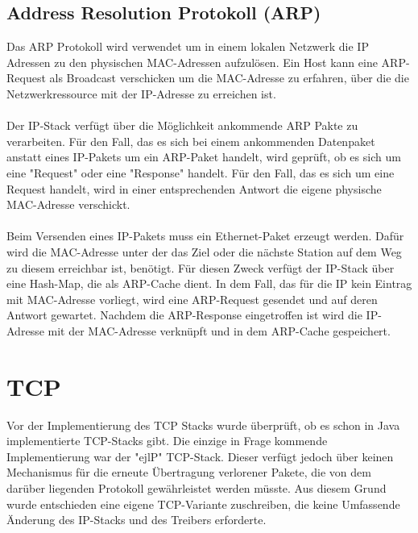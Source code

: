 \subsection{Address Resolution Protokoll (ARP)}
Das ARP Protokoll wird verwendet um in einem lokalen Netzwerk die IP Adressen zu den physischen MAC-Adressen aufzulösen. Ein Host kann eine ARP-Request als Broadcast verschicken um die MAC-Adresse zu erfahren, über die die Netzwerkressource mit der IP-Adresse zu erreichen ist. \\\\
Der IP-Stack verfügt über die Möglichkeit ankommende ARP Pakte zu verarbeiten. Für den Fall, das es sich bei einem ankommenden Datenpaket anstatt eines IP-Pakets um ein ARP-Paket handelt, wird geprüft, ob es sich um eine {}"Request"{} oder eine {}"Response"{} handelt. Für den Fall, das es sich um eine Request handelt, wird in einer entsprechenden Antwort die eigene physische MAC-Adresse verschickt. \\\\
Beim Versenden eines IP-Pakets muss ein Ethernet-Paket erzeugt werden. Dafür wird die MAC-Adresse unter der das Ziel oder die nächste Station auf dem Weg zu diesem erreichbar ist, benötigt. Für diesen Zweck verfügt der IP-Stack über eine Hash-Map, die als ARP-Cache dient. In dem Fall, das für die IP kein Eintrag mit MAC-Adresse vorliegt, wird eine ARP-Request gesendet und auf deren Antwort gewartet. Nachdem die ARP-Response eingetroffen ist wird die IP-Adresse mit der MAC-Adresse verknüpft und in dem ARP-Cache gespeichert. 


 



\section{TCP}

Vor der Implementierung des TCP Stacks wurde überprüft, ob es schon in Java implementierte TCP-Stacks gibt. Die einzige in Frage kommende Implementierung war der "{}ejlP"{} TCP-Stack. Dieser verfügt jedoch über keinen Mechanismus für die erneute Übertragung verlorener Pakete, die von dem darüber liegenden Protokoll gewährleistet werden müsste. Aus diesem Grund wurde entschieden eine eigene TCP-Variante zuschreiben, die keine Umfassende Änderung des IP-Stacks und des Treibers erforderte. 



